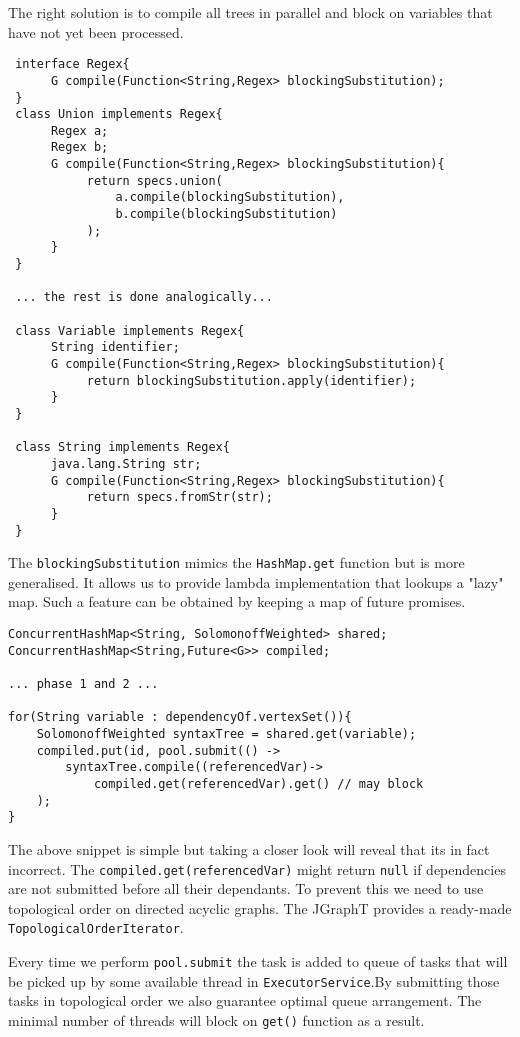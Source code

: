  The right solution is to compile all trees in parallel and block on variables that have not yet been processed.
 \begin{lstlisting}
 interface Regex{
      G compile(Function<String,Regex> blockingSubstitution);
 }
 class Union implements Regex{
      Regex a; 
      Regex b;
      G compile(Function<String,Regex> blockingSubstitution){
           return specs.union(
               a.compile(blockingSubstitution),
               b.compile(blockingSubstitution)
           );
      }
 }
 
 ... the rest is done analogically...
 
 class Variable implements Regex{
      String identifier;
      G compile(Function<String,Regex> blockingSubstitution){
           return blockingSubstitution.apply(identifier);
      }
 }
 
 class String implements Regex{
      java.lang.String str;
      G compile(Function<String,Regex> blockingSubstitution){
           return specs.fromStr(str);
      }
 }
\end{lstlisting}
The \texttt{blockingSubstitution} mimics the \texttt{HashMap.get} function but is more generalised. It allows us to provide lambda implementation 
that lookups a "lazy" map. Such a feature can be obtained by keeping a map of future promises. 
\begin{lstlisting}
ConcurrentHashMap<String, SolomonoffWeighted> shared;
ConcurrentHashMap<String,Future<G>> compiled;

... phase 1 and 2 ...

for(String variable : dependencyOf.vertexSet()){
	SolomonoffWeighted syntaxTree = shared.get(variable);
    compiled.put(id, pool.submit(() -> 
        syntaxTree.compile((referencedVar)->
            compiled.get(referencedVar).get() // may block
    );
}
\end{lstlisting}
The above snippet is simple but taking a closer look will reveal that its in fact incorrect. The \texttt{compiled.get(referencedVar)} might return \texttt{null} if
dependencies are not submitted before all their dependants. To prevent this we need to use topological order on directed acyclic graphs. The JGraphT provides a ready-made \texttt{TopologicalOrderIterator}. 

Every time we perform \texttt{pool.submit} the task is added to queue of tasks that will be picked up by some available thread in \texttt{ExecutorService}.By submitting those tasks in topological order we also guarantee optimal queue arrangement. The minimal number of threads will block on \texttt{get()} function as a result.
